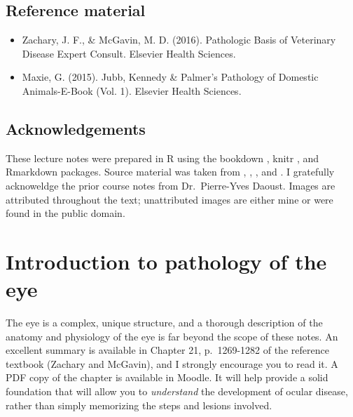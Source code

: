 \documentclass[
  openany]{article}
\providecommand{\tightlist}{%
  \setlength{\itemsep}{0pt}\setlength{\parskip}{0pt}}
\begin{document}
\hypertarget{reference-material}{%
\subsection*{Reference material}\label{reference-material}}

\begin{itemize}
\tightlist
\item
  Zachary, J. F., \& McGavin, M. D. (2016). Pathologic Basis of Veterinary Disease Expert Consult. Elsevier Health Sciences.
\item
  Maxie, G. (2015). Jubb, Kennedy \& Palmer's Pathology of Domestic Animals-E-Book (Vol. 1). Elsevier Health Sciences.
\end{itemize}

\hypertarget{acknowledgements}{%
\subsection*{Acknowledgements}\label{acknowledgements}}

These lecture notes were prepared in R \citep{R-base} using the bookdown \citep{xie2015}, knitr \citep{R-knitr}, and Rmarkdown \citep{R-rmarkdown} packages. Source material was taken from \citet{zachary2016pathologic}, \citet{dubielzig}, \citet{histobasis}, and \citet{maxie2015jubb}. I gratefully acknoweldge the prior course notes from Dr.~Pierre-Yves Daoust. Images are attributed throughout the text; unattributed images are either mine or were found in the public domain.

\hypertarget{intro}{%
\section{Introduction to pathology of the eye}\label{intro}}

The eye is a complex, unique structure, and a thorough description of the anatomy and physiology of the eye is far beyond the scope of these notes. An excellent summary is available in Chapter 21, p.~1269-1282 of the reference textbook (Zachary and McGavin), and I strongly encourage you to read it. A PDF copy of the chapter is available in Moodle. It will help provide a solid foundation that will allow you to \emph{understand} the development of ocular disease, rather than simply memorizing the steps and lesions involved.
\end{document}
